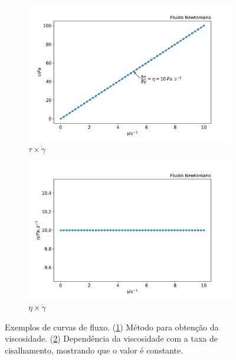 			\begin{figure}[H]
				\begin{subfigure}[t]{.5\textwidth}
					\includegraphics[width=\textwidth]{./imagens/reologia/newtoniano_exemplo_tauGP}
					\caption{\(\tau \times \dot{\gamma}\)}
					\label{fig:reol_newt_tauGP}
				\end{subfigure}%
				\begin{subfigure}[t]{.5\textwidth}
					\includegraphics[width=\textwidth]{./imagens/reologia/newtoniano_exemplo_etaGP}
					\caption{\(\eta \times \dot{\gamma}\)}
					\label{fig:reol_newt_etaGP}
				\end{subfigure}
				\caption{Exemplos de curvas de fluxo. (\ref{fig:reol_newt_tauGP}) Método para obtenção da viscosidade. (\ref{fig:reol_newt_etaGP}) Dependência da viscosidade com a taxa de cisalhamento, mostrando que o valor é constante.}
				\label{fig:reol_newt_exemplos}
			\end{figure}
				
